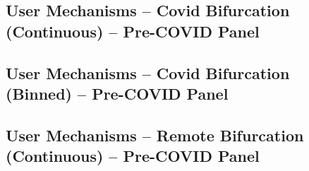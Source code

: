 \documentclass{article}
\newcommand{\cleanedresultsdir}{../../results/cleaned}
\begin{document}
% 

% 

% 

\clearpage
\begin{landscape}
\section{User Mechanisms – Covid Bifurcation (Continuous) – Pre-COVID Panel}

\end{landscape}

\clearpage
\begin{landscape}
\section{User Mechanisms – Covid Bifurcation (Binned) – Pre-COVID Panel}

\end{landscape}

\clearpage
\begin{landscape}
\section{User Mechanisms – Remote Bifurcation (Continuous) – Pre-COVID Panel}

\end{landscape}
\end{document}
